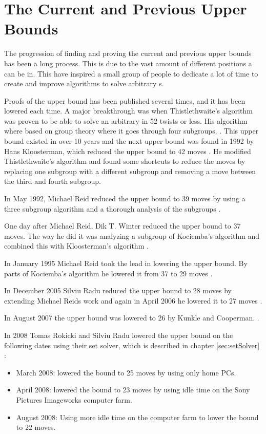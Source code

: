 \section{The Current and Previous Upper Bounds}
The progression of finding and proving the current and previous upper bounds has been a long process. This is due to the vast amount of different positions a \rubik{} can be in. This have inspired a small group of people to dedicate a lot of time to create and improve algorithms to solve arbitrary \rubik{}s.%



Proofs of the upper bound has been published several times, and it has been lowered each time.
A major breakthrough was when Thistlethwaite's algorithm was proven to be able to solve an arbitrary \rubik{} in 52 twists or less. His algorithm where based on group theory where it goes through four subgroups. \cite{jaapthistle}.
This upper bound existed in over 10 years and the next upper bound was found in 1992 by Hans Kloosterman, which reduced the upper bound to 42 moves \cite[p. 44]{rokickipdf}. 
He modified Thistlethwaite's algorithm and found some shortcuts to reduce the moves by replacing one subgroup with a different subgroup and removing a move between the third and fourth subgroup.

In May 1992, Michael Reid reduced the upper bound to 39 moves by using a three subgroup algorithm and a thorough analysis of the subgroups \cite[p. 52]{rokickipdf}.

One day after Michael Reid, Dik T. Winter reduced the upper bound to 37 moves. The way he did it was analyzing a subgroup of Kociemba's algorithm and combined this with Kloosterman's algorithm \cite[p. 53]{rokickipdf}.

In January 1995 Michael Reid took the lead in lowering the upper bound. By parts of Kociemba's algorithm he lowered it from 37 to 29 moves \cite[p. 55]{rokickipdf}.

In December 2005 Silviu Radu reduced the upper bound to 28 moves by extending Michael Reids work and again in April 2006 he lowered it to 27 moves \cite[p. 58]{rokickipdf}.

In August 2007 the upper bound was lowered to 26 by Kunkle and Cooperman. \cite[p. 63]{rokickipdf}.

In 2008 Tomas Rokicki and Silviu Radu lowered the upper bound on the following dates using their set solver, which is described in chapter \ref{sec:setSolver} \cite[p. 66]{rokickipdf}:
\begin{itemize}
\item March 2008: lowered the bound to 25 moves by using only home PCs.
\item April 2008: lowered the bound to 23 moves by using idle time on the Sony Pictures Imageworks computer farm.
\item August 2008: Using more idle time on the computer farm to lower the bound to 22 moves.
\end{itemize}

